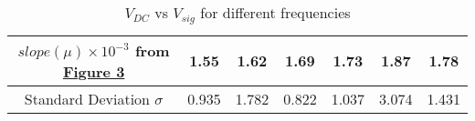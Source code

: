 \begin{table}[H]
{\begin{tabular}{|ccc|cccccc|}
	\multicolumn{3}{|c|}{$slope(\mu) \times10^{-3}$   from \href{graph:1}{Figure 3}} & \multicolumn{1}{c|}{1.55} & \multicolumn{1}{c|}{1.62} & \multicolumn{1}{c|}{1.69} & \multicolumn{1}{c|}{1.73} & \multicolumn{1}{c|}{1.87} & 1.78 \\ \hline
	\multicolumn{3}{|c|}{Standard Deviation $\sigma$} & \multicolumn{1}{c|}{0.935} & \multicolumn{1}{c|}{1.782} & \multicolumn{1}{c|}{0.822} & \multicolumn{1}{c|}{1.037} & \multicolumn{1}{c|}{3.074} & 1.431 \\ \hline
	\end{tabular}%
	}
	\label{tab:1}
	\caption{$V_{DC}$ vs $V_{sig}$ for different frequencies}
\end{table}